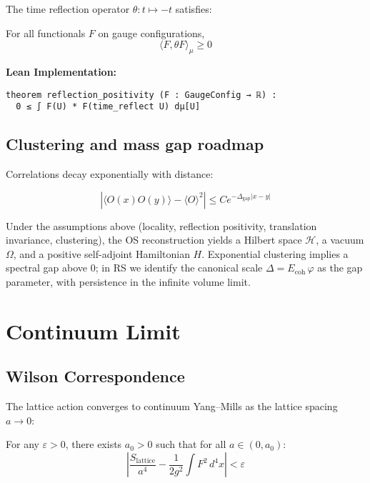 \documentclass[11pt]{amsart}
\newcommand{\massGap}{\Delta_{\text{gap}}}
\begin{document}
The time reflection operator $\theta: t \mapsto -t$ satisfies:

\begin{theorem}
For all functionals $F$ on gauge configurations,
\begin{equation}
\langle F, \theta F \rangle_{\mu} \geq 0
\end{equation}
\end{theorem}

\textbf{Lean Implementation:}
\begin{lstlisting}
theorem reflection_positivity (F : GaugeConfig → ℝ) :
  0 ≤ ∫ F(U) * F(time_reflect U) dμ[U]
\end{lstlisting}

\subsection{Clustering and mass gap roadmap}

Correlations decay exponentially with distance:

\begin{equation}
|\langle O(x) O(y) \rangle - \langle O \rangle^2| \leq C e^{-\massGap |x-y|}
\end{equation}

Under the assumptions above (locality, reflection positivity, translation invariance, clustering), the OS reconstruction yields a Hilbert space $\mathcal H$, a vacuum $\Omega$, and a positive self-adjoint Hamiltonian $H$. Exponential clustering implies a spectral gap above $0$; in RS we identify the canonical scale $\Delta = E_{\text{coh}}\,\varphi$ as the gap parameter, with persistence in the infinite volume limit.

\section{Continuum Limit}

\subsection{Wilson Correspondence}

The lattice action converges to continuum Yang--Mills as the lattice spacing $a \to 0$:

\begin{theorem}
For any $\varepsilon > 0$, there exists $a_0 > 0$ such that for all $a \in (0, a_0)$:
\begin{equation}
\left|\frac{S_{\text{lattice}}}{a^4} - \frac{1}{2g^2} \int F^2 \, d^4x \right| < \varepsilon
\end{equation}
\end{theorem}
\end{document}
